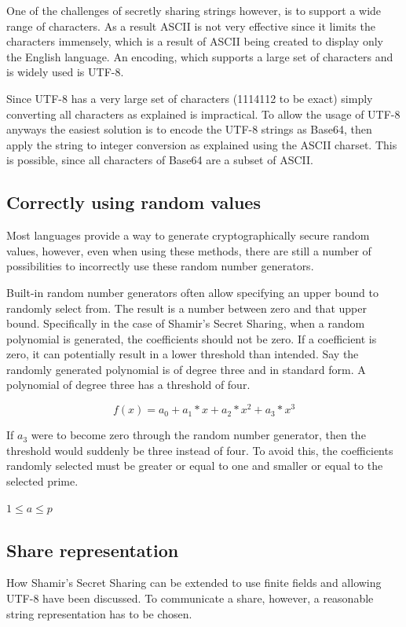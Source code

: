 One of the challenges of secretly sharing strings however, is to support a wide
range of characters. As a result ASCII is not very effective since it limits
the characters immensely, which is a result of ASCII being created to display
only the English language. An encoding, which supports a large set of
characters and is widely used is UTF-8.

Since UTF-8 has a very large set of characters (1114112 to be exact) simply
converting all characters as explained is impractical. To allow the usage of
UTF-8 anyways the easiest solution is to encode the UTF-8 strings as Base64,
then apply the string to integer conversion as explained using the ASCII
charset. This is possible, since all characters of Base64 are a subset of
ASCII. \cite{unicode_spec}

\subsection{Correctly using random values}

Most languages provide a way to generate cryptographically secure random
values, however, even when using these methods, there are still a number of
possibilities to incorrectly use these random number generators.

Built-in random number generators often allow specifying an upper bound to
randomly select from. The result is a number between zero and that upper bound.
Specifically in the case of Shamir's Secret Sharing, when a random polynomial
is generated, the coefficients should not be zero. If a coefficient is zero, it
can potentially result in a lower threshold than intended. Say the randomly
generated polynomial is of degree three and in standard form. A polynomial of
degree three has a threshold of four.

$$f(x) = a_0 + a_1 * x + a_2 * x^2 + a_3 * x^3$$

If $a_3$ were to become zero through the random number generator, then the
threshold would suddenly be three instead of four. To avoid this, the
coefficients randomly selected must be greater or equal to one and smaller or
equal to the selected prime.

$1 \leq a \leq p$

\subsection{Share representation}

How Shamir's Secret Sharing can be extended to use finite fields and allowing
UTF-8 have been discussed. To communicate a share, however, a reasonable string
representation has to be chosen.

